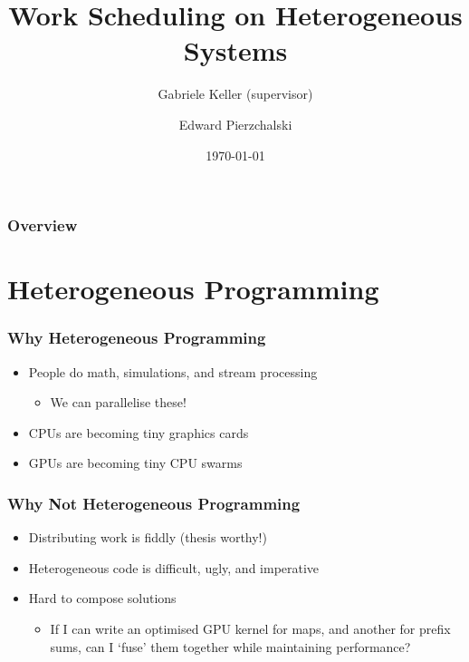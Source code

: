 \documentclass{beamer}
\title[Heterogeneous Scheduling]{Work Scheduling on Heterogeneous Systems}
\author{Gabriele Keller (supervisor) \and Edward Pierzchalski}
\institute[UNSW] %
{
University of New South Wales \\ %
\medskip
\textit{e.pierzchalski@unsw.edu.au} %
}
\date{\today} %
\begin{document}
\begin{frame}
\titlepage %
\end{frame}

\begin{frame}
\frametitle{Overview} %
\tableofcontents %
\end{frame}


\section{Heterogeneous Programming}

\begin{frame}
\frametitle{Why Heterogeneous Programming}
\begin{itemize}
\item People do math, simulations, and stream processing
  \begin{itemize}
   \item We can parallelise these!
  \end{itemize}

\item CPUs are becoming tiny graphics cards
\item GPUs are becoming tiny CPU swarms
\end{itemize}
\end{frame}

\begin{frame}
\frametitle{Why Not Heterogeneous Programming}
\begin{itemize}
\item Distributing work is fiddly (thesis worthy!)
\item Heterogeneous code is difficult, ugly, and imperative
\item Hard to compose solutions
  \begin{itemize}
    \item If I can write an optimised GPU kernel for maps, and another for prefix sums, can I `fuse' them together while maintaining performance?
  \end{itemize}
\end{itemize}
\end{frame}
\end{document}
